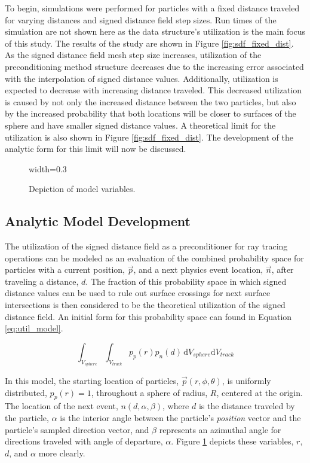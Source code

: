To begin, simulations were performed for particles with a fixed distance
traveled for varying distances and signed distance field step sizes. Run times
of the simulation are not shown here as the data structure's utilization is the
main focus of this study. The results of the study are shown in
 Figure \ref{fig:sdf_fixed_dist}. As the signed distance field mesh step size
increases, utilization of the preconditioning method structure decreases due to the increasing
error associated with the interpolation of signed distance values. Additionally,
utilization is expected to decrease with increasing distance traveled. This
decreased utilization is caused by not only the increased distance between the
two particles, but also by the increased probability that both locations will be
closer to surfaces of the sphere and have smaller signed distance values. A
theoretical limit for the utilization is also shown in
 Figure \ref{fig:sdf_fixed_dist}. The development of the analytic form for this
limit will now be discussed.

\begin{figure}[ht]
  \centering
  {width=0.3\textwidth}
  \caption{Depiction of model variables.}
  \label{fig:model}
\end{figure}

\subsection{Analytic Model Development}
  
The utilization of the signed distance field as a preconditioner for ray tracing
operations can be modeled as an evaluation of the combined probability space for
particles with a current position, $\vec{p}$, and a next physics event location,
$\vec{n}$, after traveling a distance, $d$. The fraction of this probability
space in which signed distance values can be used to rule out surface crossings
for next surface intersections is then considered to be the theoretical
utilization of the signed distance field. An initial form for this probability
space can found in Equation \ref{eq:util_model}.

\begin{equation}
  \label{eq:util_model}
\int_{V_{sphere}}\int_{V_{track}} p_p(r) p_n(d) \, \mathrm{d}V_{sphere}\mathrm{d}V_{track}
\end{equation}

In this model, the starting location of particles, $\vec{p}(r,\phi,\theta)$, is
uniformly distributed, $p_p(r)=1$, throughout a sphere of radius, $R$, centered
at the origin.  The location of the next event, $n(d,\alpha,\beta)$, where $d$
is the distance traveled by the particle, $\alpha$ is the interior angle between
the particle's \textit{position} vector and the particle's sampled direction
vector, and $\beta$ represents an azimuthal angle for directions traveled with
angle of departure, $\alpha$.  Figure \ref{fig:model} depicts these variables, $r$,
$d$, and $\alpha$ more clearly.

